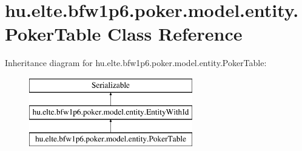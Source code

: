 \hypertarget{classhu_1_1elte_1_1bfw1p6_1_1poker_1_1model_1_1entity_1_1_poker_table}{}\section{hu.\+elte.\+bfw1p6.\+poker.\+model.\+entity.\+Poker\+Table Class Reference}
\label{classhu_1_1elte_1_1bfw1p6_1_1poker_1_1model_1_1entity_1_1_poker_table}
Inheritance diagram for hu.\+elte.\+bfw1p6.\+poker.\+model.\+entity.\+Poker\+Table\+:\begin{figure}[H]
\begin{center}
\leavevmode
\includegraphics[height=3.000000cm]{classhu_1_1elte_1_1bfw1p6_1_1poker_1_1model_1_1entity_1_1_poker_table}
\end{center}
\end{figure}
